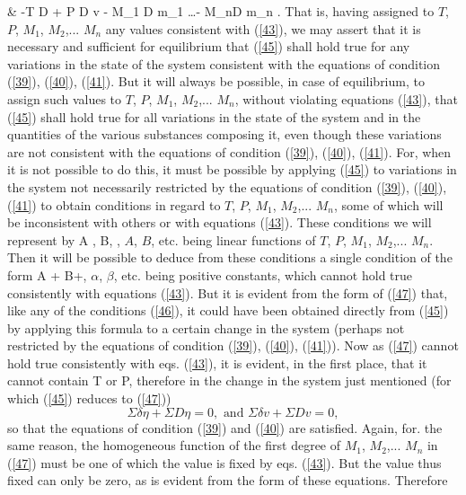 \documentclass[12pt]{article}
\begin{document}
& -T \Sigma D \eta + P \Sigma D v - M_1 \Sigma D m_1 \dots - M_n\Sigma D m_n .  \label{45}\eqe
That is, having assigned to $T$, $P$, $M_1$, $M_2$,... $M_n$ any values consistent with (\ref{43}), we may assert that it is necessary and sufficient for equilibrium that (\ref{45}) shall hold true for any variations in the state of the system consistent with the equations of condition (\ref{39}), (\ref{40}),
(\ref{41}). But it will always be possible, in case of equilibrium, to assign such values to $T$, $P$, $M_1$, $M_2$,... $M_n$, without violating equations (\ref{43}), that (\ref{45}) shall hold true for all variations in the state of the system and in the quantities of the various substances composing it, even though these variations are not consistent with the equations of condition (\ref{39}), (\ref{40}), (\ref{41}). For, when it is not possible to do this, it must be possible by applying (\ref{45}) to variations in the system not necessarily restricted by the equations of condition (\ref{39}), (\ref{40}), (\ref{41}) to obtain conditions in regard to $T$, $P$, $M_1$, $M_2$,... $M_n$, some of which will be inconsistent with others or with equations (\ref{43}). These conditions we will represent by
\eqs A ,\text{ } B, ,                  \label{46}\eqe
$A$, $B$, etc. being linear functions of $T$, $P$, $M_1$, $M_2$,... $M_n$. Then it will be possible to deduce from these conditions a single condition of the form
\eqs \alpha A + \beta B+,                 \label{47}\eqe
$\alpha$, $\beta$, etc. being positive constants, which cannot hold true consistently with equations (\ref{43}). But it is evident from the form of (\ref{47}) that, like any of the conditions (\ref{46}), it could have been obtained directly from (\ref{45}) by applying this formula to a certain change in the system (perhaps not restricted by the equations of condition (\ref{39}), (\ref{40}), (\ref{41})). Now as (\ref{47}) cannot hold true consistently with eqs. (\ref{43}), it is evident, in the first place, that it cannot contain T or P, therefore in the change in the system just mentioned (for which (\ref{45}) reduces to (\ref{47}))
$$\Sigma \delta \eta + \Sigma D \eta = 0, \text{     and     } \Sigma \delta v + \Sigma D v = 0,$$
so that the equations of condition (\ref{39}) and (\ref{40}) are satisfied. Again, for. the same reason, the homogeneous function of the first degree of $M_1$, $M_2$,... $M_n$ in (\ref{47}) must be one of which the value is fixed by eqs. (\ref{43}). But the value thus fixed can only be zero, as is evident from the form of these equations. Therefore
\end{document}
